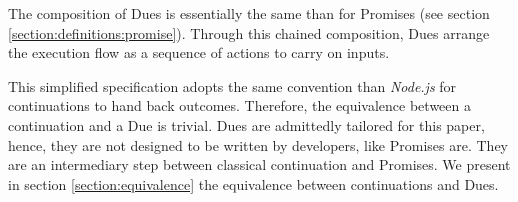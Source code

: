 The composition of Dues is essentially the same than for Promises (see section \ref{section:definitions:promise}).
Through this chained composition, Dues arrange the execution flow as a sequence of actions to carry on inputs.




This simplified specification adopts the same convention than \textit{Node.js} for continuations to hand back outcomes.
Therefore, the equivalence between a continuation and a Due is trivial.
Dues are admittedly tailored for this paper, hence, they are not designed to be written by developers, like Promises are.
They are an intermediary step between classical continuation and Promises.
We present in section \ref{section:equivalence} the equivalence between continuations and Dues.


